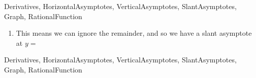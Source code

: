 \begin{tagblock}{Derivatives, HorizontalAsymptotes, VerticalAsymptotes, SlantAsymptotes, Graph, RationalFunction  }
\begin{question}
\begin{enumerate}
\vspace{1in}

\item This means we can ignore the remainder, and so we have a slant asymptote at $y = $

\end{enumerate}

	
\begin{tags}
	   Derivatives, HorizontalAsymptotes, VerticalAsymptotes, SlantAsymptotes, Graph, RationalFunction
\end{tags}
	
\begin{diary}
\end{diary}
	
\begin{solution}
	   
\end{solution}
	
\end{question}

\end{tagblock}


